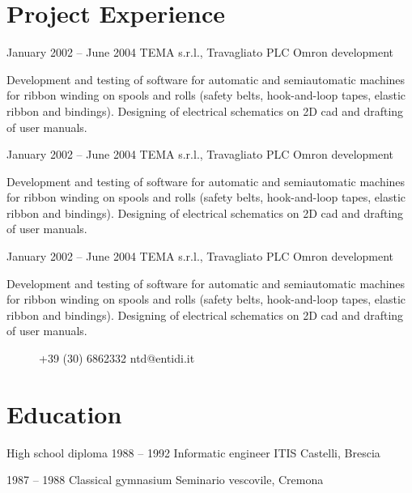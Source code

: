 \documentclass[fontsize=10pt]{tccv}
\begin{document}
\section{Project Experience}

\begin{eventlist}

\item{January 2002 -- June 2004}
     {TEMA s.r.l., Travagliato}
     {PLC Omron development}

Development and testing of software for automatic and semiautomatic
machines for ribbon winding on spools and rolls (safety belts,
hook-and-loop tapes, elastic ribbon and bindings). Designing of
electrical schematics on 2D cad and drafting of user manuals.

\item{January 2002 -- June 2004}
     {TEMA s.r.l., Travagliato}
     {PLC Omron development}

Development and testing of software for automatic and semiautomatic
machines for ribbon winding on spools and rolls (safety belts,
hook-and-loop tapes, elastic ribbon and bindings). Designing of
electrical schematics on 2D cad and drafting of user manuals.

\item{January 2002 -- June 2004}
     {TEMA s.r.l., Travagliato}
     {PLC Omron development}

Development and testing of software for automatic and semiautomatic
machines for ribbon winding on spools and rolls (safety belts,
hook-and-loop tapes, elastic ribbon and bindings). Designing of
electrical schematics on 2D cad and drafting of user manuals.

\end{eventlist}


\begin{figure}[t] %
      {+39 (30) 6862332}
      {ntd@entidi.it}
\end{figure}

\section{Education}

\begin{yearlist}

\item[High school diploma]{1988 -- 1992}
     {Informatic engineer}
     {ITIS Castelli, Brescia}

\item{1987 -- 1988}
     {Classical gymnasium}
     {Seminario vescovile, Cremona}

\end{yearlist}
\end{document}
